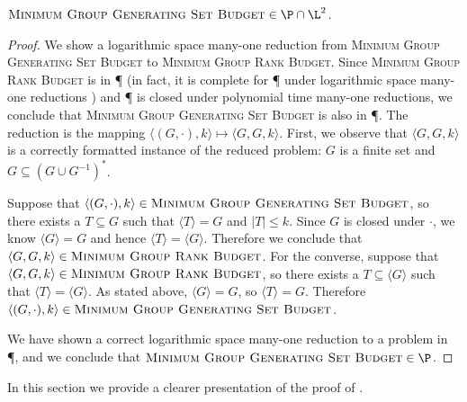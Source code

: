 \documentclass[]{article}
\newcommand{\gen}[1]{{\langle #1 \rangle}}
\begin{document}
\begin{theorem}
  $\textsc{Minimum Group Generating Set Budget} \in \P \cap \L^2$.
\end{theorem}
\begin{proof}
  We show a logarithmic space many-one reduction from \textsc{Minimum Group Generating Set Budget} to \textsc{Minimum Group Rank Budget}.
  Since \textsc{Minimum Group Rank Budget} is in \P{} (in fact, it is complete for \P{} under logarithmic space many-one reductions \cite[Problem~A.8.11]{ghr95}) and \P{} is closed under polynomial time many-one reductions, we conclude that \textsc{Minimum Group Generating Set Budget} is also in \P.
  The reduction is the mapping $\langle (G, \cdot), k \rangle \mapsto \langle G, G, k \rangle$.
  First, we observe that $\langle G, G, k \rangle$ is a correctly formatted instance of the reduced problem: $G$ is a finite set and $G \subseteq (G \cup G^{-1})^*$.

  Suppose that $\langle (G, \cdot), k \rangle \in \textsc{Minimum Group Generating Set Budget}$, so there exists a $T \subseteq G$ such that $\gen{T} = G$ and $|T| \leq k$.
  Since $G$ is closed under $\cdot$, we know $\gen{G} = G$ and hence $\gen{T} = \gen{G}$.
  Therefore we conclude that $\langle G, G, k \rangle \in \textsc{Minimum Group Rank Budget}$.
  For the converse, suppose that $\langle G, G, k \rangle \in \textsc{Minimum Group Rank Budget}$, so there exists a $T \subseteq \gen{G}$ such that $\gen{T} = \gen{G}$.
  As stated above, $\gen{G} = G$, so $\gen{T} = G$.
  Therefore $\langle (G, \cdot), k \rangle \in \textsc{Minimum Group Generating Set Budget}$.

  We have shown a correct logarithmic space many-one reduction to a problem in \P, and we conclude that $\textsc{Minimum Group Generating Set Budget} \in \P$.
\end{proof}

In this section we provide a clearer presentation of the proof of \cite[Theorem~7]{at06}.
\end{document}
